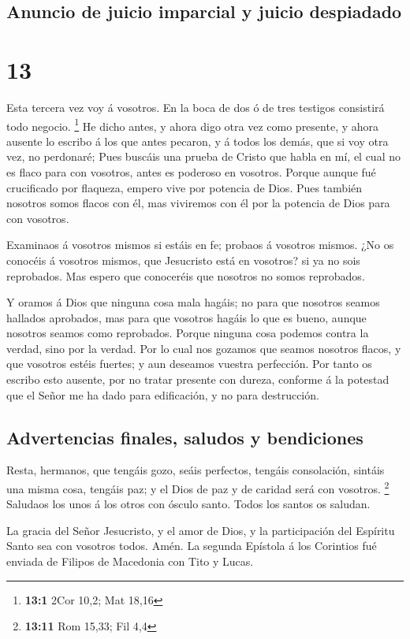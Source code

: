 \hypertarget{anuncio-de-juicio-imparcial-y-juicio-despiadado}{%
\subsection{Anuncio de juicio imparcial y juicio
despiadado}\label{anuncio-de-juicio-imparcial-y-juicio-despiadado}}

\hypertarget{section-12}{%
\section{13}\label{section-12}}

 Esta tercera vez voy á vosotros. En la boca de dos ó de
tres testigos consistirá todo negocio. \footnote{\textbf{13:1} 2Cor
  10,2; Mat 18,16}  He dicho antes, y ahora digo otra vez
como presente, y ahora ausente lo escribo á los que antes pecaron, y á
todos los demás, que si voy otra vez, no perdonaré;  Pues
buscáis una prueba de Cristo que habla en mí, el cual no es flaco para
con vosotros, antes es poderoso en vosotros.  Porque
aunque fué crucificado por flaqueza, empero vive por potencia de Dios.
Pues también nosotros somos flacos con él, mas viviremos con él por la
potencia de Dios para con vosotros.

 Examinaos á vosotros mismos si estáis en fe; probaos á
vosotros mismos. ¿No os conocéis á vosotros mismos, que Jesucristo está
en vosotros? si ya no sois reprobados.  Mas espero que
conoceréis que nosotros no somos reprobados.

 Y oramos á Dios que ninguna cosa mala hagáis; no para que
nosotros seamos hallados aprobados, mas para que vosotros hagáis lo que
es bueno, aunque nosotros seamos como reprobados.  Porque
ninguna cosa podemos contra la verdad, sino por la verdad.
 Por lo cual nos gozamos que seamos nosotros flacos, y que
vosotros estéis fuertes; y aun deseamos vuestra perfección.
 Por tanto os escribo esto ausente, por no tratar
presente con dureza, conforme á la potestad que el Señor me ha dado para
edificación, y no para destrucción.

\hypertarget{advertencias-finales-saludos-y-bendiciones}{%
\subsection{Advertencias finales, saludos y
bendiciones}\label{advertencias-finales-saludos-y-bendiciones}}

 Resta, hermanos, que tengáis gozo, seáis perfectos,
tengáis consolación, sintáis una misma cosa, tengáis paz; y el Dios de
paz y de caridad será con vosotros. \footnote{\textbf{13:11} Rom 15,33;
  Fil 4,4}  Saludaos los unos á los otros con ósculo
santo. Todos los santos os saludan.

 La gracia del Señor Jesucristo, y el amor de Dios, y la
participación del Espíritu Santo sea con vosotros todos. Amén. La
segunda Epístola á los Corintios fué enviada de Filipos de Macedonia con
Tito y Lucas. 
